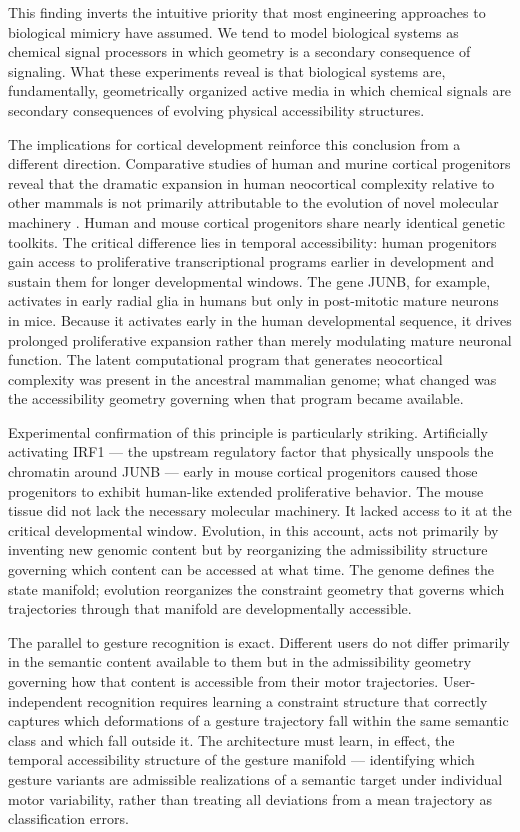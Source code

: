 \documentclass[11pt, a4paper]{article}
\theoremstyle{definition}
\begin{document}
This finding inverts the intuitive priority that most engineering approaches to biological mimicry have assumed. We tend to model biological systems as chemical signal processors in which geometry is a secondary consequence of signaling. What these experiments reveal is that biological systems are, fundamentally, geometrically organized active media in which chemical signals are secondary consequences of evolving physical accessibility structures.

The implications for cortical development reinforce this conclusion from a different direction. Comparative studies of human and murine cortical progenitors reveal that the dramatic expansion in human neocortical complexity relative to other mammals is not primarily attributable to the evolution of novel molecular machinery \cite{javed2026}. Human and mouse cortical progenitors share nearly identical genetic toolkits. The critical difference lies in temporal accessibility: human progenitors gain access to proliferative transcriptional programs earlier in development and sustain them for longer developmental windows. The gene JUNB, for example, activates in early radial glia in humans but only in post-mitotic mature neurons in mice. Because it activates early in the human developmental sequence, it drives prolonged proliferative expansion rather than merely modulating mature neuronal function. The latent computational program that generates neocortical complexity was present in the ancestral mammalian genome; what changed was the accessibility geometry governing when that program became available.

Experimental confirmation of this principle is particularly striking. Artificially activating IRF1 --- the upstream regulatory factor that physically unspools the chromatin around JUNB --- early in mouse cortical progenitors caused those progenitors to exhibit human-like extended proliferative behavior. The mouse tissue did not lack the necessary molecular machinery. It lacked access to it at the critical developmental window. Evolution, in this account, acts not primarily by inventing new genomic content but by reorganizing the admissibility structure governing which content can be accessed at what time. The genome defines the state manifold; evolution reorganizes the constraint geometry that governs which trajectories through that manifold are developmentally accessible.

The parallel to gesture recognition is exact. Different users do not differ primarily in the semantic content available to them but in the admissibility geometry governing how that content is accessible from their motor trajectories. User-independent recognition requires learning a constraint structure that correctly captures which deformations of a gesture trajectory fall within the same semantic class and which fall outside it. The architecture must learn, in effect, the temporal accessibility structure of the gesture manifold --- identifying which gesture variants are admissible realizations of a semantic target under individual motor variability, rather than treating all deviations from a mean trajectory as classification errors.
\end{document}
